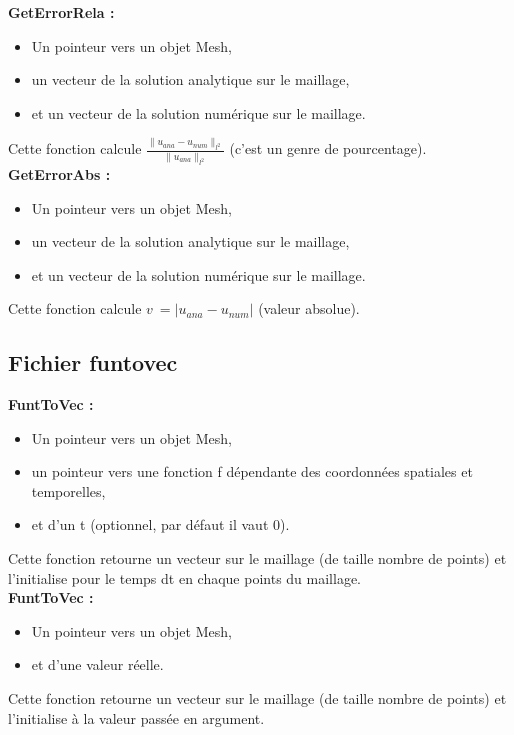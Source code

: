 \documentclass[french]{article}
\newcommand{\elodie}{\hfill{\color{red}{Élodie}}}
\newcommand{\alexis}{\hfill{\color{green}{Alexis}}}
\begin{document}
\textbf{GetErrorRela :}\alexis
\begin{itemize}
\item Un pointeur vers un objet Mesh,
\item un vecteur de la solution analytique sur le maillage,
\item et un vecteur de la solution numérique sur le maillage.
\end{itemize}
Cette fonction calcule $\frac{\|u_{ana} - u_{num}\|_{l^2}}{\|u_{ana}\|_{l^2}}$ (c'est un genre de pourcentage).\\

\textbf{GetErrorAbs :}\alexis
\begin{itemize}
\item Un pointeur vers un objet Mesh,
\item un vecteur de la solution analytique sur le maillage,
\item et un vecteur de la solution numérique sur le maillage.
\end{itemize}
Cette fonction calcule $v\:=|u_{ana}-u_{num}|$ (valeur absolue).

\subsection{Fichier funtovec}
\textbf{FuntToVec :}\elodie
\begin{itemize}
\item Un pointeur vers un objet Mesh,
\item un pointeur vers une fonction f dépendante des coordonnées spatiales et temporelles,
\item et d'un t (optionnel, par défaut il vaut 0).
\end{itemize}
Cette fonction retourne un vecteur sur le maillage (de taille nombre de points) et l'initialise pour le temps dt en chaque points du maillage.\\

\textbf{FuntToVec :}\elodie
\begin{itemize}
\item Un pointeur vers un objet Mesh,
\item et d'une valeur réelle.
\end{itemize}
Cette fonction retourne un vecteur sur le maillage (de taille nombre de points) et l'initialise à la valeur passée en argument.
\end{document}
